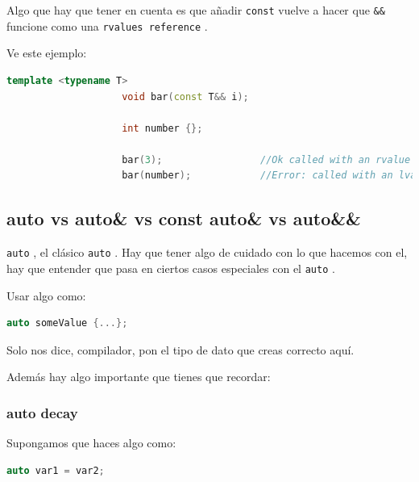 \documentclass[12pt, fleqn]{report}                             %
\theoremstyle{break}                                            %
\newcommand{\textCode}[1]  { \texttt{#1} }                      %
\begin{document}
                Algo que hay que tener en cuenta es que añadir \textCode{const} vuelve a hacer
                que \textCode{\&\&} funcione como una \textCode{rvalues reference}.

                Ve este ejemplo:
                \begin{lstlisting}[language=C++, gobble=20]
                    template <typename T>
                    void bar(const T&& i);

                    int number {};

                    bar(3);                 //Ok called with an rvalue
                    bar(number);            //Error: called with an lvalue
                \end{lstlisting}
                
            \clearpage
            \subsection{auto vs auto\& vs const auto\& vs auto\&\&} 

                \textCode{auto}, el clásico \textCode{auto}. Hay que tener algo de cuidado con lo que hacemos
                con el, hay que entender que pasa en ciertos casos especiales con el \textCode{auto}.

                Usar algo como:
                \begin{lstlisting}[language=C++, gobble=20]
                    auto someValue {...};
                \end{lstlisting}

                Solo nos dice, compilador, pon el tipo de dato que creas correcto aquí.
                
                Además hay algo importante que tienes que recordar:

                \subsubsection{auto decay} 

                    Supongamos que haces algo como:
                    \begin{lstlisting}[language=C++, gobble=24]
                        auto var1 = var2;
                    \end{lstlisting}
\end{document}
